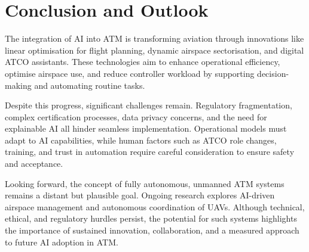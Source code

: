 \section{Conclusion and Outlook}

The integration of \gls{AI} into \gls{ATM} is transforming aviation through innovations like linear optimisation for flight planning, dynamic airspace sectorisation, and digital \gls{ATCO} assistants. 
These technologies aim to enhance operational efficiency, optimise airspace use, and reduce controller workload by supporting decision-making and automating routine tasks.

Despite this progress, significant challenges remain. 
Regulatory fragmentation, complex certification processes, data privacy concerns, and the need for explainable \gls{AI} all hinder seamless implementation. 
Operational models must adapt to \gls{AI} capabilities, while human factors such as \gls{ATCO} role changes, training, and trust in automation require careful consideration to ensure safety and acceptance.

Looking forward, the concept of fully autonomous, unmanned \gls{ATM} systems remains a distant but plausible goal. 
Ongoing research explores \gls{AI}-driven airspace management and autonomous coordination of \glspl{UAV}. 
Although technical, ethical, and regulatory hurdles persist, the potential for such systems highlights the importance of sustained innovation, collaboration, and a measured approach to future \gls{AI} adoption in \gls{ATM}.